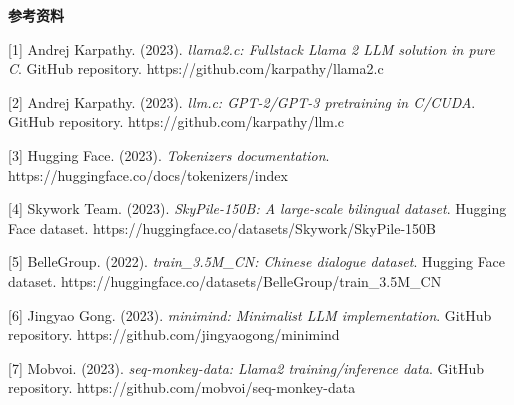 \documentclass[
]{article}
\begin{document}
\textbf{参考资料}

{[}1{]} Andrej Karpathy. (2023). \emph{llama2.c: Fullstack Llama 2 LLM
solution in pure C}. GitHub repository.
https://github.com/karpathy/llama2.c

{[}2{]} Andrej Karpathy. (2023). \emph{llm.c: GPT-2/GPT-3 pretraining in
C/CUDA}. GitHub repository. https://github.com/karpathy/llm.c

{[}3{]} Hugging Face. (2023). \emph{Tokenizers documentation}.
https://huggingface.co/docs/tokenizers/index

{[}4{]} Skywork Team. (2023). \emph{SkyPile-150B: A large-scale
bilingual dataset}. Hugging Face dataset.
https://huggingface.co/datasets/Skywork/SkyPile-150B

{[}5{]} BelleGroup. (2022). \emph{train\_3.5M\_CN: Chinese dialogue
dataset}. Hugging Face dataset.
https://huggingface.co/datasets/BelleGroup/train\_3.5M\_CN

{[}6{]} Jingyao Gong. (2023). \emph{minimind: Minimalist LLM
implementation}. GitHub repository.
https://github.com/jingyaogong/minimind

{[}7{]} Mobvoi. (2023). \emph{seq-monkey-data: Llama2 training/inference
data}. GitHub repository. https://github.com/mobvoi/seq-monkey-data
\end{document}
